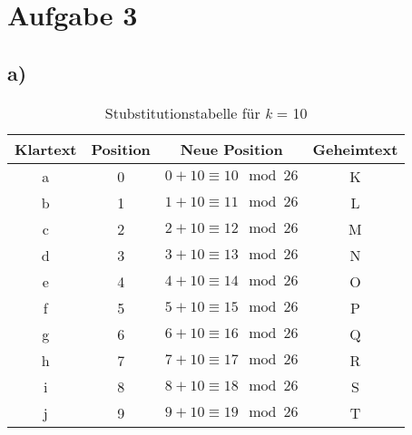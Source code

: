 \documentclass[10pt,a4paper]{article}
\begin{document}
\section*{Aufgabe 3}
\subsection*{a)}
\begin{table}[htdp]
\caption{Stubstitutionstabelle für \textsl{k} = 10}
\begin{center}
\begin{tabular}{|c|c|c|c|}
	Klartext & Position & Neue Position & Geheimtext\\ \hline
	a & 0 & \begin{math} 0 + 10 \equiv 10 \mod 26\end{math} & K \\ \hline
	b & 1 & \begin{math} 1 + 10 \equiv 11 \mod 26 \end{math} & L \\ \hline
	c & 2 & \begin{math} 2 + 10  \equiv 12  \mod 26 \end{math} & M \\ \hline
	d & 3 & \begin{math} 3 + 10  \equiv 13 \mod 26 \end{math}  & N \\ \hline
	e & 4 & \begin{math} 4 + 10 \equiv 14 \mod 26 \end{math}  & O \\ \hline
	f & 5 & \begin{math} 5 + 10 \equiv 15 \mod 26 \end{math}   & P \\ \hline
	g & 6 & \begin{math} 6 + 10 \equiv 16 \mod 26 \end{math}  & Q \\ \hline
	h & 7 & \begin{math} 7 + 10 \equiv 17 \mod 26 \end{math}  & R \\ \hline
	i & 8 & \begin{math} 8 + 10 \equiv 18 \mod 26 \end{math} & S \\ \hline
	j & 9 & \begin{math} 9 + 10 \equiv 19 \mod 26 \end{math}   & T \\ \hline

\end{tabular}
\end{center}
\end{table}
\end{document}
